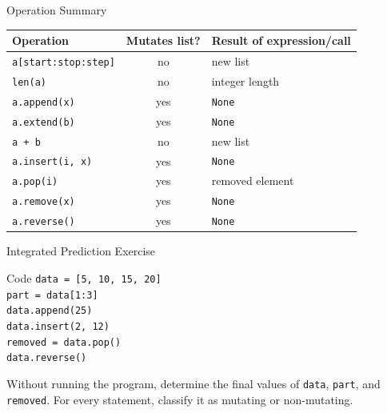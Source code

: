\documentclass[aspectratio=169,10pt]{beamer}
\begin{document}
\begin{frame}[shrink=4]{Operation Summary}
  \begin{center}
    \renewcommand{\arraystretch}{1.25}
    \begin{tabular}{l|c|l}
      \textbf{Operation} & \textbf{Mutates list?} & \textbf{Result of expression/call} \\\hline
      \texttt{a[start:stop:step]} & no & new list \\
      \texttt{len(a)} & no & integer length \\
      \texttt{a.append(x)} & yes & \texttt{None} \\
      \texttt{a.extend(b)} & yes & \texttt{None} \\
      \texttt{a + b} & no & new list \\
      \texttt{a.insert(i, x)} & yes & \texttt{None} \\
      \texttt{a.pop(i)} & yes & removed element \\
      \texttt{a.remove(x)} & yes & \texttt{None} \\
      \texttt{a.reverse()} & yes & \texttt{None}
    \end{tabular}
  \end{center}
\end{frame}

\begin{frame}{Integrated Prediction Exercise}
  \begin{block}{Code}
    \texttt{data = [5, 10, 15, 20]}\\
    \texttt{part = data[1:3]}\\
    \texttt{data.append(25)}\\
    \texttt{data.insert(2, 12)}\\
    \texttt{removed = data.pop()}\\
    \texttt{data.reverse()}
  \end{block}

  \begin{activity}
    Without running the program, determine the final values of \texttt{data}, \texttt{part}, and \texttt{removed}. For every statement, classify it as mutating or non-mutating.
  \end{activity}
\end{frame}
\end{document}
